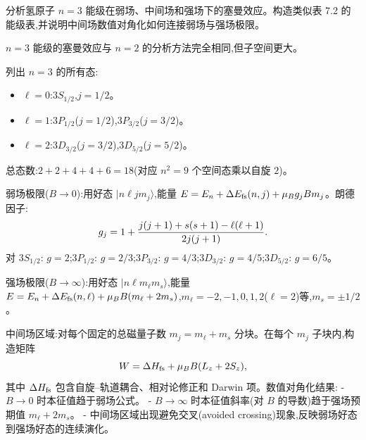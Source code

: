 \begin{question}
分析氢原子 $n=3$ 能级在弱场、中间场和强场下的塞曼效应。构造类似表 7.2 的能级表,并说明中间场数值对角化如何连接弱场与强场极限。
\end{question}
\begin{solution}
$n=3$ 能级的塞曼效应与 $n=2$ 的分析方法完全相同,但子空间更大。

列出 $n=3$ 的所有态:
\begin{itemize}
\item $\ell=0$:$3S_{1/2}$,$j=1/2$。
\item $\ell=1$:$3P_{1/2}$($j=1/2$),$3P_{3/2}$($j=3/2$)。
\item $\ell=2$:$3D_{3/2}$($j=3/2$),$3D_{5/2}$($j=5/2$)。
\end{itemize}
总态数:$2+2+4+4+6=18$(对应 $n^2=9$ 个空间态乘以自旋 $2$)。

弱场极限($B\to0$):用好态 $|n\ell j m_j\rangle$,能量 $E=E_n+\Delta E_{\rm fs}(n,j)+\mu_B g_j B m_j$。朗德因子:
\[
g_j=1+{j(j+1)+s(s+1)-\ell(\ell+1)\over2j(j+1)}.
\]
对 $3S_{1/2}$: $g=2$;$3P_{1/2}$: $g=2/3$;$3P_{3/2}$: $g=4/3$;$3D_{3/2}$: $g=4/5$;$3D_{5/2}$: $g=6/5$。

强场极限($B\to\infty$):用好态 $|n\ell m_\ell m_s\rangle$,能量 $E=E_n+\Delta E_{\rm fs}(n,\ell)+\mu_B B(m_\ell+2m_s)$,$m_\ell=-2,-1,0,1,2$($\ell=2$)等,$m_s=\pm1/2$。

中间场区域:对每个固定的总磁量子数 $m_j=m_\ell+m_s$ 分块。在每个 $m_j$ 子块内,构造矩阵
\[
W = \Delta H_{\rm fs} + \mu_B B(L_z+2S_z),
\]
其中 $\Delta H_{\rm fs}$ 包含自旋--轨道耦合、相对论修正和 Darwin 项。数值对角化结果:
- $B\to0$ 时本征值趋于弱场公式。
- $B\to\infty$ 时本征值斜率(对 $B$ 的导数)趋于强场预期值 $m_\ell+2m_s$。
- 中间场区域出现避免交叉(avoided crossing)现象,反映弱场好态到强场好态的连续演化。
\end{solution}

